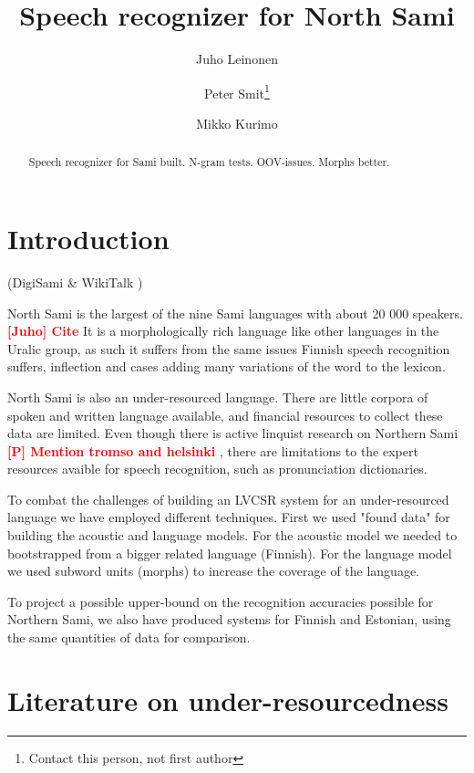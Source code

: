 \documentclass[10pt,b5paper,utf8]{article}
\newcommand{\todo}[2]{{\textcolor{red}{\bf [#1] #2 }}}
\begin{document}
\title{Speech recognizer for North Sami} \author{Juho Leinonen \and Peter Smit\footnote{Contact this person, not first author} \and Mikko Kurimo} \maketitle

\begin{abstract} Speech recognizer for Sami built. N-gram tests. OOV-issues. Morphs better. \end{abstract}

\section{Introduction}

(DigiSami \& WikiTalk \cite{wilcock2013wikitalk}\cite{jokinen2014multimodal}\cite{jokinen2014open})

North Sami is the largest of the nine Sami languages with about 20 000 speakers. \todo{Juho}{Cite}  It is a morphologically rich language like other languages in the Uralic group, as such it suffers from the same issues Finnish speech recognition suffers, inflection and cases adding many variations of the word to the lexicon. 

North Sami is also an under-resourced language. There are little corpora of spoken and written language available, and financial resources to collect these data are limited. Even though there is active linquist research on Northern Sami \todo{P}{Mention tromso and helsinki}, there are limitations to the expert resources avaible for speech recognition, such as pronunciation dictionaries.

To combat the challenges of building an LVCSR system for an under-resourced language we have employed different techniques. First we used "found data" for building the acoustic and language models. For the acoustic model we needed to bootstrapped from a bigger related language (Finnish). For the language model we used subword units (morphs) to increase the coverage of the language.

To project a possible upper-bound on the recognition accuracies possible for Northern Sami, we also have produced systems for Finnish and Estonian, using the same quantities of data for comparison.


\section{Literature on under-resourcedness}
\end{document}
